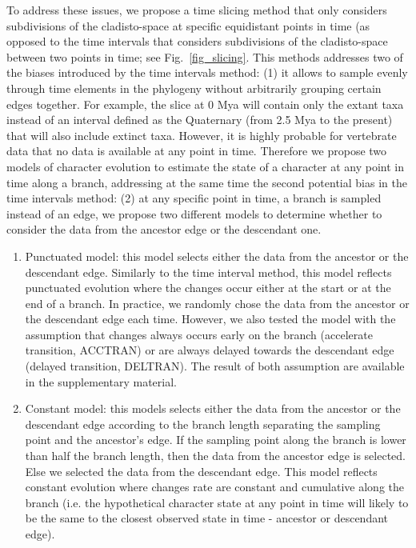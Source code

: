 \documentclass[12pt,letterpaper]{article}
\begin{document}
To address these issues, we propose a time slicing method that only considers subdivisions of the cladisto-space at specific equidistant points in time (as opposed to the time intervals that considers  subdivisions of the cladisto-space between two points in time; see Fig.~\ref{fig_slicing}. This methods addresses two of the biases introduced by the time intervals method: (1) it allows to sample evenly through time elements in the phylogeny without arbitrarily grouping certain edges together. For example, the slice at 0 Mya will contain only the extant taxa instead of an interval defined as the Quaternary (from 2.5 Mya to the present) that will also include extinct taxa. However, it is highly probable for vertebrate data that no data is available at any point in time. Therefore we propose two models of character evolution to estimate the state of a character at any point in time along a branch, addressing at the same time the second potential bias in the time intervals method: (2) at any specific point in time, a branch is sampled instead of an edge, we propose two different models to determine whether to consider the data from the ancestor edge or the descendant one.
\begin{enumerate}
\item{Punctuated model:} this model selects either the data from the ancestor or the descendant edge. Similarly to the time interval method, this model reflects punctuated evolution where the changes occur either at the start or at the end of a branch. In practice, we randomly chose the data from the ancestor or the descendant edge each time. However, we also tested the model with the assumption that changes always occurs early on the branch (accelerate transition, ACCTRAN) or are always delayed towards the descendant edge (delayed transition, DELTRAN). The result of both assumption are available in the supplementary material.
\item{Constant model:} this models selects either the data from the ancestor or the descendant edge according to the branch length separating the sampling point and the ancestor's edge. If the sampling point along the branch is lower than half the branch length, then the data from the ancestor edge is selected. Else we selected the data from the descendant edge. This model reflects constant evolution where changes rate are constant and cumulative along the branch (i.e. the hypothetical character state at any point in time will likely to be the same to the closest observed state in time - ancestor or descendant edge).
\end{enumerate}
\end{document}
